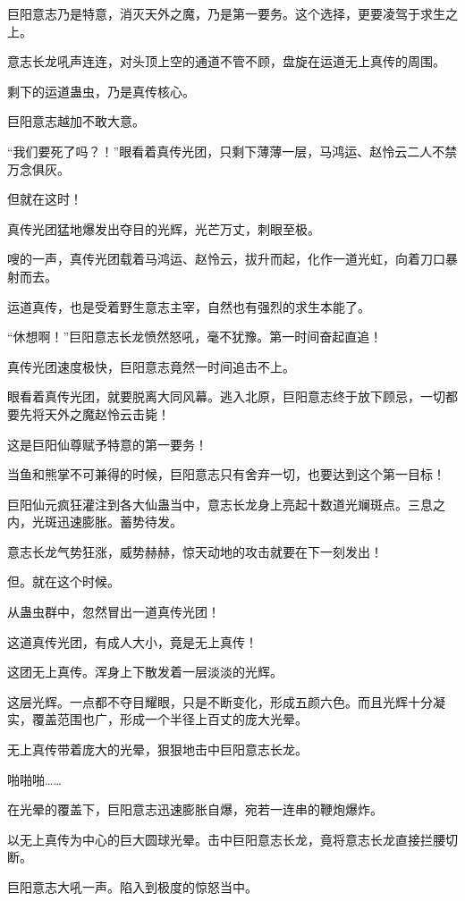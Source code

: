 \begin{this_body}
巨阳意志乃是特意，消灭天外之魔，乃是第一要务。这个选择，更要凌驾于求生之上。

意志长龙吼声连连，对头顶上空的通道不管不顾，盘旋在运道无上真传的周围。

剩下的运道蛊虫，乃是真传核心。

巨阳意志越加不敢大意。

“我们要死了吗？！”眼看着真传光团，只剩下薄薄一层，马鸿运、赵怜云二人不禁万念俱灰。

但就在这时！

真传光团猛地爆发出夺目的光辉，光芒万丈，刺眼至极。

嗖的一声，真传光团载着马鸿运、赵怜云，拔升而起，化作一道光虹，向着刀口暴射而去。

运道真传，也是受着野生意志主宰，自然也有强烈的求生本能了。

“休想啊！”巨阳意志长龙愤然怒吼，毫不犹豫。第一时间奋起直追！

真传光团速度极快，巨阳意志竟然一时间追击不上。

眼看着真传光团，就要脱离大同风幕。逃入北原，巨阳意志终于放下顾忌，一切都要先将天外之魔赵怜云击毙！

这是巨阳仙尊赋予特意的第一要务！

当鱼和熊掌不可兼得的时候，巨阳意志只有舍弃一切，也要达到这个第一目标！

巨阳仙元疯狂灌注到各大仙蛊当中，意志长龙身上亮起十数道光斓斑点。三息之内，光斑迅速膨胀。蓄势待发。

意志长龙气势狂涨，威势赫赫，惊天动地的攻击就要在下一刻发出！

但。就在这个时候。

从蛊虫群中，忽然冒出一道真传光团！

这道真传光团，有成人大小，竟是无上真传！

这团无上真传。浑身上下散发着一层淡淡的光辉。

这层光辉。一点都不夺目耀眼，只是不断变化，形成五颜六色。而且光辉十分凝实，覆盖范围也广，形成一个半径上百丈的庞大光晕。

无上真传带着庞大的光晕，狠狠地击中巨阳意志长龙。

啪啪啪……

在光晕的覆盖下，巨阳意志迅速膨胀自爆，宛若一连串的鞭炮爆炸。

以无上真传为中心的巨大圆球光晕。击中巨阳意志长龙，竟将意志长龙直接拦腰切断。

巨阳意志大吼一声。陷入到极度的惊怒当中。


\end{this_body}
